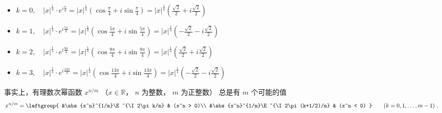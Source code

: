 \begin{itemize}
\item $k = 0,\quad |x|^{\frac{1}{4}} \cdot e^{i\frac{\pi}{4}} = |x|^{\frac{1}{4}} \left( \cos\frac{\pi}{4} + i\sin\frac{\pi}{4} \right) = |x|^{\frac{1}{4}} \left( \frac{\sqrt{2}}{2} + i\frac{\sqrt{2}}{2} \right)$
\item $k = 1,\quad |x|^{\frac{1}{4}} \cdot e^{i\frac{5\pi}{4}} = |x|^{\frac{1}{4}} \left( \cos\frac{5\pi}{4} + i\sin\frac{5\pi}{4} \right) = |x|^{\frac{1}{4}} \left( -\frac{\sqrt{2}}{2} - i\frac{\sqrt{2}}{2} \right)$
\item $k = 2,\quad |x|^{\frac{1}{4}} \cdot e^{i\frac{9\pi}{4}} = |x|^{\frac{1}{4}} \left( \cos\frac{9\pi}{4} + i\sin\frac{9\pi}{4} \right) = |x|^{\frac{1}{4}} \left( \frac{\sqrt{2}}{2} + i\frac{\sqrt{2}}{2} \right)$
\item $k = 3,\quad |x|^{\frac{1}{4}} \cdot e^{i\frac{13\pi}{4}} = |x|^{\frac{1}{4}} \left( \cos\frac{13\pi}{4} + i\sin\frac{13\pi}{4} \right) = |x|^{\frac{1}{4}} \left( -\frac{\sqrt{2}}{2} - i\frac{\sqrt{2}}{2} \right)$
\end{itemize}

事实上，有理数次幂函数 $x^{n/m}$ （$x\in \mathbb R$， $n$ 为整数， $m$ 为正整数） 总是有 $m$ 个可能的值
\begin{equation}
x^{n/m} = \leftgroup{
&\abs{x^n}^{1/m}\E^{\I 2\pi k/m} & (x^n > 0)\\
&\abs{x^n}^{1/m}\E^{\I 2\pi (k+1/2)/m} & (x^n < 0)
}\qquad (k = 0,1,\dots, m-1)~.
\end{equation}